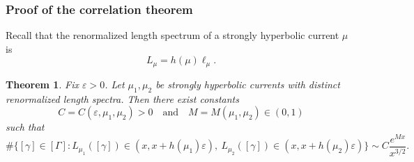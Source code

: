 \documentclass[12pt]{amsart}
\numberwithin{equation}{section}
\numberwithin{figure}{section}
\newtheorem{theorem}[equation]{Theorem}
\theoremstyle{definition}
\theoremstyle{plain}
\begin{document}
\subsubsection{Proof of the correlation theorem}

Recall that the renormalized length spectrum of a strongly hyperbolic current $\mu$ is
\[
L_\mu=h(\mu)\ell_\mu.
\]

\begin{theorem}
\label{thm:main}
Fix $\varepsilon>0$. Let $\mu_1,\mu_2$ be strongly hyperbolic currents with distinct renormalized length spectra. Then there exist constants
\[
C=C(\varepsilon,\mu_1,\mu_2)>0
\quad\text{and}\quad
M=M(\mu_1,\mu_2)\in(0,1)
\]
such that
\[
\#\Big\{
[\gamma]\in[\Gamma]:
L_{\mu_1}([\gamma])
\in
(x,x+h(\mu_1)\varepsilon),
\
L_{\mu_2}([\gamma])
\in
(x,x+h(\mu_2)\varepsilon)
\Big\}
\sim
C\frac{e^{Mx}}{x^{3/2}}.
\]
\end{theorem}
\end{document}
